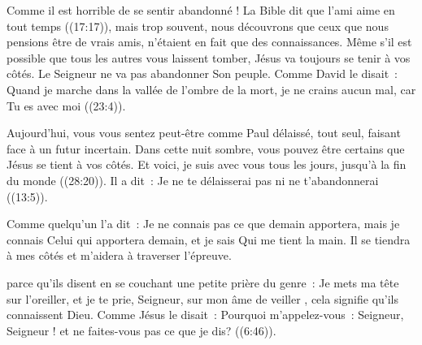 Comme il est horrible de se sentir abandonné !
 La Bible dit que \og l'ami 
 aime en tout temps \fg{} ((17:17)), mais trop souvent,
 nous découvrons que ceux que nous pensions être de vrais amis,
 n'étaient en fait que des connaissances.
 Même s'il est possible que tous les autres vous laissent tomber,
 Jésus va toujours se tenir à vos côtés.
 Le Seigneur ne va pas abandonner Son peuple.
 Comme David le disait~: 
 \og Quand je marche dans la vallée de l'ombre de la mort,
 je ne crains aucun mal, car Tu es avec moi \fg{} ((23:4)).


Aujourd'hui, vous vous sentez peut-être comme Paul \ocadr délaissé,
 tout seul, faisant face à un futur incertain.
 Dans cette nuit sombre, vous pouvez être certains que Jésus
 se tient à vos côtés.
 \og Et voici, je suis avec vous tous les jours, jusqu'à la fin du monde \fg{}
 ((28:20)).
 Il a dit~: 
 \og Je ne te délaisserai pas ni ne t'abandonnerai \fg{}
 ((13:5)). 

Comme quelqu'un l'a dit~: 
 \og Je ne connais 
 pas ce que demain apportera, mais je connais Celui qui apportera demain,
 et je sais Qui me tient la main. \fg{}
 Il se tiendra à mes côtés et m'aidera à traverser l'épreuve. 

\dvrule






 parce qu'ils disent en se couchant une petite prière
 du genre~: 
 \og Je mets ma tête sur l'oreiller, et je te prie, Seigneur,
 sur mon âme de veiller \fg{}, cela signifie qu'ils connaissent Dieu.
 Comme Jésus le disait~: 
 \og Pourquoi m'appelez-vous~: Seigneur, Seigneur !
 et ne faites-vous pas ce que je dis? \fg{} ((6:46)).

